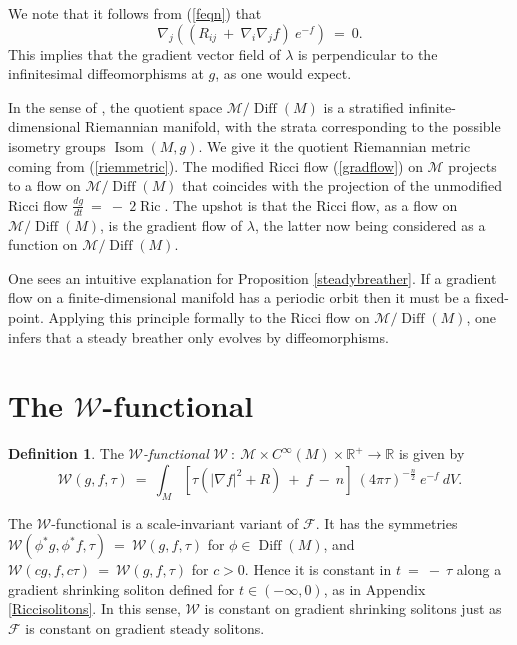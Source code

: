 \documentclass[12pt]{amsart}
\newcommand{\Diff}{\operatorname{Diff}}
\newcommand{\Isom}{\operatorname{Isom}}
\newcommand{\R}{{\mathbb R}}
\newcommand{\Ric}{\operatorname{Ric}}
\numberwithin{equation}{section}
\theoremstyle{plain}
\theoremstyle{definition}
\newtheorem{definition}[equation]{Definition}
\theoremstyle{remark}
\begin{document}
We note that it follows from (\ref{feqn}) that
\begin{equation}
\nabla_j \left( (R_{ij} \: + \: \nabla_i \nabla_j f) \: e^{-f} \right)
\: = \: 0.
\end{equation}
This implies that the gradient vector field of $\lambda$ is perpendicular
to the infinitesimal diffeomorphisms at $g$, as one would expect.

In the sense of  \cite{Bourguignon}, the quotient space ${\mathcal M}/\Diff(M)$ 
is a stratified
infinite-dimensional Riemannian manifold, with the strata corresponding
to the possible isometry groups $\Isom(M, g)$.
We give it the quotient Riemannian metric coming from
(\ref{riemmetric}). 
The modified Ricci flow (\ref{gradflow}) on 
${\mathcal M}$ projects to a flow on ${\mathcal M}/\Diff(M)$
that coincides with the projection of the unmodified Ricci flow
$\frac{dg}{dt} \: = \: - \: 2 \Ric$. The upshot is that  the
Ricci flow, as a flow on ${\mathcal M}/\Diff(M)$, is the gradient flow of
$\lambda$, the latter now being considered as a function on 
${\mathcal M}/\Diff(M)$.

One sees an intuitive explanation for Proposition \ref{steadybreather}.
If a gradient flow on a finite-dimensional manifold has a periodic
orbit then it must be a fixed-point.  Applying this principle formally
to the Ricci flow on ${\mathcal M}/\Diff(M)$, one infers that a steady
breather only evolves by diffeomorphisms.

\section{The ${\mathcal W}$-functional}
\label{Basic Example for Section 3.1}

\begin{definition}
The {\em ${\mathcal W}$-functional} ${\mathcal W} \: : \: {\mathcal M} \times C^\infty(M) \times
\R^+ \rightarrow \R$ is given by
\begin{equation}
{\mathcal W}(g, f, \tau) \: = \: \int_M \left[ \tau \left(
|\nabla f|^2 + R \right) \: + \: f \: - \: n \right] \:
(4\pi \tau)^{-\frac{n}{2}} \: e^{-f} \: dV.
\end{equation}
\end{definition}

The ${\mathcal W}$-functional
is a scale-invariant variant of ${\mathcal F}$. It
has the symmetries ${\mathcal W}(\phi^* g, \phi^* f, \tau) \: = \:
{\mathcal W}(g, f, \tau)$ for $\phi \in \Diff(M)$, and 
${\mathcal W}(cg, f, c\tau) \: = \: {\mathcal W}(g, f, \tau)$
for $c > 0$. Hence it is constant in $t \: = \: - \: \tau$ along
a gradient shrinking soliton defined for $t \in (-\infty, 0)$,
as in Appendix \ref{Riccisolitons}. In this sense, ${\mathcal W}$ is
constant on gradient shrinking solitons just as ${\mathcal F}$ is
constant on gradient steady solitons.
\end{document}
